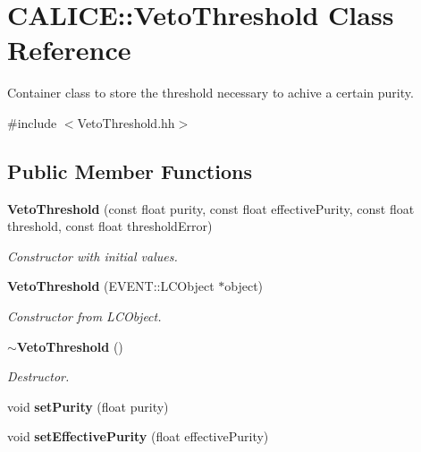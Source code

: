 \section{CALICE::VetoThreshold Class Reference}
\label{classCALICE_1_1VetoThreshold}


Container class to store the threshold necessary to achive a certain purity.  


{\ttfamily \#include $<$VetoThreshold.hh$>$}\subsection*{Public Member Functions}
\begin{DoxyCompactItemize}
\item 
{\bf VetoThreshold} (const float purity, const float effectivePurity, const float threshold, const float thresholdError)\label{classCALICE_1_1VetoThreshold_a226f6dbb174911449b725d22212ec27f}

\begin{DoxyCompactList}\small\item\em Constructor with initial values. \item\end{DoxyCompactList}\item 
{\bf VetoThreshold} (EVENT::LCObject $\ast$object)\label{classCALICE_1_1VetoThreshold_a4431022bd02ec81814b58a483aac7027}

\begin{DoxyCompactList}\small\item\em Constructor from LCObject. \item\end{DoxyCompactList}\item 
{\bf $\sim$VetoThreshold} ()\label{classCALICE_1_1VetoThreshold_a9f9b18a6fa485c21230ac896344f048d}

\begin{DoxyCompactList}\small\item\em Destructor. \item\end{DoxyCompactList}\item 
void {\bfseries setPurity} (float purity)\label{classCALICE_1_1VetoThreshold_ac5e33b1fc8d827493b95814ee3ec761a}

\item 
void {\bfseries setEffectivePurity} (float effectivePurity)\label{classCALICE_1_1VetoThreshold_af0b58c4922e7c8b20a077bc0c814492a}


\end{DoxyCompactItemize}
